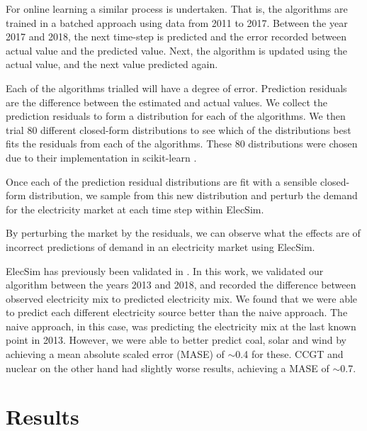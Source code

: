 \documentclass[final,3p,times,twocolumn,numbers]{elsarticle}
\begin{document}
For online learning a similar process is undertaken. That is, the algorithms are trained in a batched approach using data from 2011 to 2017. Between the year 2017 and 2018, the next time-step is predicted and the error recorded between actual value and the predicted value. Next, the algorithm is updated using the actual value, and the next value predicted again.


 Each of the algorithms trialled will have a degree of error. Prediction residuals are the difference between the estimated and actual values. We collect the prediction residuals to form a distribution for each of the algorithms. We then trial 80 different closed-form distributions to see which of the distributions best fits the residuals from each of the algorithms. These 80 distributions were chosen due to their implementation in scikit-learn \cite{scikit-learn}.

Once each of the prediction residual distributions are fit with a sensible closed-form distribution, we sample from this new distribution and perturb the demand for the electricity market at each time step within ElecSim.

By perturbing the market by the residuals, we can observe what the effects are of incorrect predictions of demand in an electricity market using ElecSim. %

ElecSim has previously been validated in \cite{Kell2020}. In this work, we validated our algorithm between the years 2013 and 2018, and recorded the difference between observed electricity mix to predicted electricity mix. We found that we were able to predict each different electricity source better than the naive approach. The naive approach, in this case, was predicting the electricity mix at the last known point in 2013. However, we were able to better predict coal, solar and wind by achieving a mean absolute scaled error (MASE) of ${\sim}$0.4 for these. CCGT and nuclear on the other hand had slightly worse results, achieving a MASE of ${\sim}$0.7.



\section{Results}
\label{sec:results}
\end{document}
